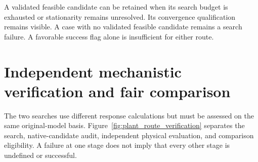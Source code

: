 A validated feasible candidate can be retained when its search budget is exhausted or stationarity remains unresolved. Its convergence qualification remains visible. A case with no validated feasible candidate remains a search failure. A favorable success flag alone is insufficient for either route.

\section{Independent mechanistic verification and fair comparison}

The two searches use different response calculations but must be assessed on the same original-model basis. Figure~\ref{fig:plant_route_verification} separates the search, native-candidate audit, independent physical evaluation, and comparison eligibility. A failure at one stage does not imply that every other stage is undefined or successful.

